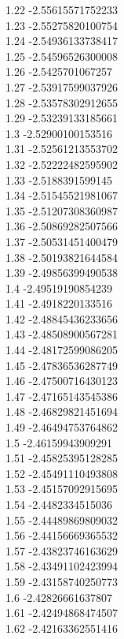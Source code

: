 {1.22	-2.55615571752233\\
1.23	-2.55275820100754\\
1.24	-2.54936133738417\\
1.25	-2.54596526300008\\
1.26	-2.5425701067257\\
1.27	-2.53917599037926\\
1.28	-2.53578302912655\\
1.29	-2.53239133185661\\
1.3	-2.52900100153516\\
1.31	-2.52561213553702\\
1.32	-2.52222482595902\\
1.33	-2.5188391599145\\
1.34	-2.51545521981067\\
1.35	-2.51207308360987\\
1.36	-2.50869282507566\\
1.37	-2.50531451400479\\
1.38	-2.50193821644584\\
1.39	-2.49856399490538\\
1.4	-2.49519190854239\\
1.41	-2.4918220133516\\
1.42	-2.48845436233656\\
1.43	-2.48508900567281\\
1.44	-2.48172599086205\\
1.45	-2.47836536287749\\
1.46	-2.47500716430123\\
1.47	-2.47165143545386\\
1.48	-2.46829821451694\\
1.49	-2.46494753764862\\
1.5	-2.46159943909291\\
1.51	-2.45825395128285\\
1.52	-2.45491110493808\\
1.53	-2.45157092915695\\
1.54	-2.4482334515036\\
1.55	-2.44489869809032\\
1.56	-2.44156669365532\\
1.57	-2.43823746163629\\
1.58	-2.43491102423994\\
1.59	-2.43158740250773\\
1.6	-2.42826661637807\\
1.61	-2.42494868474507\\
1.62	-2.42163362551416\\
}
